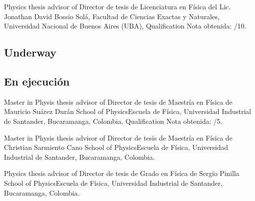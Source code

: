 \ifeng
Physics thesis advisor of
\else
Director de tesis de Licenciatura en Física del
\fi
Lic. Jonathan David Bossio Solá, \at Facultad de Ciencias Exactas y Naturales, Universidad Nacional de Buenos Aires (UBA), \ifeng Qualification \else Nota obtenida: /10.

\ifeng
\subsection*{Underway}
\else
\subsection*{En ejecución}
\fi

\ifeng
Master in Physis thesis advisor of
\else
Director de tesis de Maestría en Física de
\fi
Mauricio Suárez Durán \at \ifeng School of Physics\else Escuela de Física\fi, Universidad Industrial de Santander, Bucaramanga, Colombia, \ifeng Qualification \else Nota obtenida: /5.

\ifeng
Master in Physis thesis advisor of
\else
Director de tesis de Maestría en Física de
\fi
Christian Sarmiento Cano \at \ifeng School of Physics\else Escuela de Física\fi, Universidad Industrial de Santander, Bucaramanga, Colombia.

\ifeng
Physics thesis advisor of
\else
Director de tesis de Grado en Física de
\fi
Sergio Pinilla \at \ifeng School of Physics\else Escuela de Física\fi, Universidad Industrial de Santander, Bucaramanga, Colombia.
